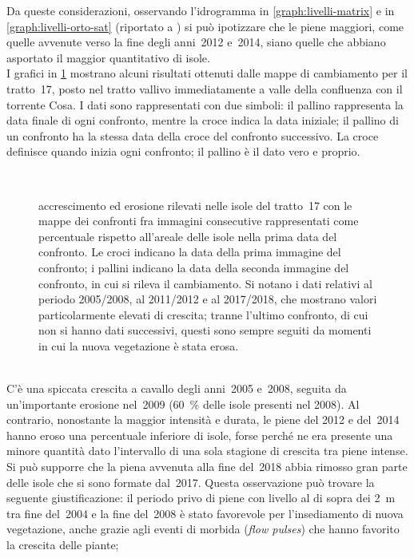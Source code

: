 Da queste considerazioni, osservando l'idrogramma in \cref{graph:livelli-matrix} e in \cref{graph:livelli-orto-sat} (riportato a ) si può ipotizzare che le piene maggiori, come quelle avvenute verso la fine degli anni~2012 e~2014, siano quelle che abbiano asportato il maggior quantitativo di isole.
\\
I grafici in \cref{graph:tr-17-camb} mostrano alcuni risultati ottenuti dalle mappe di cambiamento per il tratto~17, posto nel tratto vallivo immediatamente a valle della confluenza con il torrente Cosa.
I dati sono rappresentati con due simboli: il pallino rappresenta la data finale di ogni confronto, mentre la croce indica la data iniziale; il pallino di un confronto ha la stessa data della croce del confronto successivo. 
La croce definisce quando inizia ogni confronto; il pallino è il dato vero e proprio.
%
\begin{figure}
	\centering
	
	\\
	
	\caption[cambiamenti rilevati nelle isole nel tratto~17]{accrescimento ed erosione rilevati nelle isole del tratto~17 con le mappe dei confronti fra immagini consecutive rappresentati come percentuale rispetto all'areale delle isole nella prima data del confronto.
	Le croci indicano la data della prima immagine del confronto; i pallini indicano la data della seconda immagine del confronto, in cui si rileva il cambiamento.
	Si notano i dati relativi al periodo 2005/2008, al 2011/2012 e al 2017/2018, che mostrano valori particolarmente elevati di crescita; tranne l'ultimo confronto, di cui non si hanno dati successivi, questi sono sempre seguiti da momenti in cui la nuova vegetazione è stata erosa.}
	\label{graph:tr-17-camb}
\end{figure}
%
\\
C'è una spiccata crescita a cavallo degli anni~2005 e~2008, seguita da un'importante erosione nel~2009 (\SI{60}{\percent} delle isole presenti nel 2008).
Al contrario, nonostante la maggior intensità e durata, le piene del 2012 e del~2014 hanno eroso una percentuale inferiore di isole, forse perché ne era presente una minore quantità dato l'intervallo di una sola stagione di crescita tra piene intense.
\\
Si può supporre che la piena avvenuta alla fine del~2018 abbia rimosso gran parte delle isole che si sono formate dal~2017.
Questa osservazione può trovare la seguente giustificazione: il periodo privo di piene con livello al di sopra dei \SI{2}{\m} tra fine del~2004 e la fine del~2008 è stato favorevole per l'insediamento di nuova vegetazione, anche grazie agli eventi di morbida (\emph{flow pulses}) che hanno favorito la crescita delle piante;
